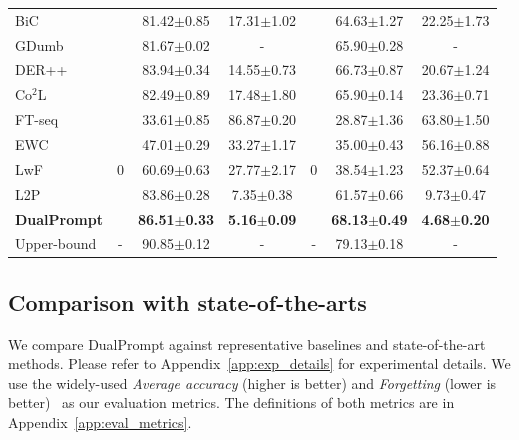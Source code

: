 \documentclass[runningheads]{llncs}
\newcommand{\method}{DualPrompt\xspace}
\begin{document}
\begin{table}[t!]
\begin{center}
{\begin{tabular}{l||c|cc||c|cc}
 BiC \cite{wu2019large} & & 81.42\scriptsize{$\pm$0.85} & 17.31\scriptsize{$\pm$1.02} && 64.63\scriptsize{$\pm$1.27} & 22.25\scriptsize{$\pm$1.73} \\
 GDumb \cite{prabhu2020gdumb} & & 81.67\scriptsize{$\pm$0.02} & - && 65.90\scriptsize{$\pm$0.28} & -  \\
 DER++ \cite{buzzega2020dark} & & 83.94\scriptsize{$\pm$0.34} & 14.55\scriptsize{$\pm$0.73} && 66.73\scriptsize{$\pm$0.87} & 20.67\scriptsize{$\pm$1.24} \\
 Co$^2$L \cite{cha2021co2l} & & 82.49\scriptsize{$\pm$0.89} & 17.48\scriptsize{$\pm$1.80} && 65.90\scriptsize{$\pm$0.14} & 23.36\scriptsize{$\pm$0.71} \\
 \midrule
 FT-seq & \multirow{5}{*}{0} & 33.61\scriptsize{$\pm$0.85} & 86.87\scriptsize{$\pm$0.20} & \multirow{5}{*}{0} & 28.87\scriptsize{$\pm$1.36} & 63.80\scriptsize{$\pm$1.50}\\
 EWC \cite{kirkpatrick2017overcoming} & & 47.01\scriptsize{$\pm$0.29} & 33.27\scriptsize{$\pm$1.17} && 35.00\scriptsize{$\pm$0.43} & 56.16\scriptsize{$\pm$0.88} \\
 LwF \cite{li2017learning} & & 60.69\scriptsize{$\pm$0.63} & 27.77\scriptsize{$\pm$2.17} && 38.54\scriptsize{$\pm$1.23} & 52.37\scriptsize{$\pm$0.64} \\
 {L2P} \cite{wang2021learning} & & {83.86\scriptsize{$\pm$0.28}} & {7.35\scriptsize{$\pm$0.38}} &&{61.57\scriptsize{$\pm$0.66}} & {9.73\scriptsize{$\pm$0.47}} \\
 \bf{\method} & & \bf 86.51\scriptsize{$\pm$0.33} & \bf 5.16\scriptsize{$\pm$0.09} & & \bf 68.13\scriptsize{$\pm$0.49} & \bf 4.68\scriptsize{$\pm$0.20}  \\
\midrule
Upper-bound & -& 90.85\scriptsize{$\pm$0.12} & - & - & 79.13\scriptsize{$\pm$0.18} & - \\
\bottomrule
\end{tabular}
}
\end{center}%
\end{table} 

\subsection{Comparison with state-of-the-arts} \label{sec:exp-class-inc}
We compare \method against representative baselines and state-of-the-art methods. 
Please refer to Appendix~\ref{app:exp_details} for experimental details. 
We use the widely-used \emph{Average accuracy} (higher is better) and \emph{Forgetting} (lower is better)~\cite{lopez2017gradient,chaudhry2018efficient,mai2021online} as our evaluation metrics. The definitions of both metrics are in Appendix~\ref{app:eval_metrics}.
\end{document}
